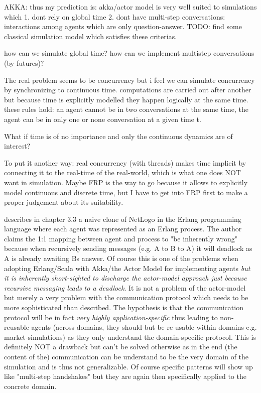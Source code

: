 AKKA: thus my prediction is: akka/actor model is very well suited to simulations which 1. dont rely on global time 2. dont have multi-step conversations: interactions among agents which are only question-answer. TODO: find some classical simulation model which satisfies these criterias.

how can we simulate global time? how can we implement multistep conversations (by futures)?

The real problem seems to be concurrency but i feel we can simulate concurrency by synchronizing to continuous time. computations are carried out after another but because time is explicitly modelled they happen logically at the same time. these rules hold: an agent cannot be in two conversations at the same time, the agent can be in only one or none conversation at a given time t.

What if time is of no importance and only the continuous dynamics are of interest?

To put it another way: real concurrency (with threads) makes time implicit by connecting it to the real-time of the real-world, which is what one does NOT want in simulation. Maybe FRP is the way to go because it allows to explicitly model continuous and discrete time, but I have to get into FRP first to make a proper judgement about its suitability.

\cite{bezirgiannis_improving_2013} describes in chapter 3.3 a naive clone of NetLogo in the Erlang programming language where each agent was represented as an Erlang process. The author claims the 1:1 mapping between agent and process to "be inherently wrong" because when recursively sending messages (e.g. A to B to A) it will deadlock as A is already awaiting Bs answer. Of course this is one of the problems when adopting Erlang/Scala with Akka/the Actor Model for implementing agents \textit{but it is inherently short-sighted to discharge the actor-model approach just because recursive messaging leads to a deadlock}. It is not a problem of the actor-model but merely a very problem with the communication protocol which needs to be more sophisticated than \cite{bezirgiannis_improving_2013} described. The hypothesis is that the communication protocol will be in fact \textit{very highly application-specific} thus leading to non-reusable agents (across domains, they should but be re-usable within domains e.g. market-simulations) as they only understand the domain-specific protocol. This is definitely NOT a drawback but can't be solved otherwise as in the end (the content of the) communication can be understand to be the very domain of the simulation and is thus not generalizable. Of course specific patterns will show up like "multi-step handshakes" but they are again then specifically applied to the concrete domain.

